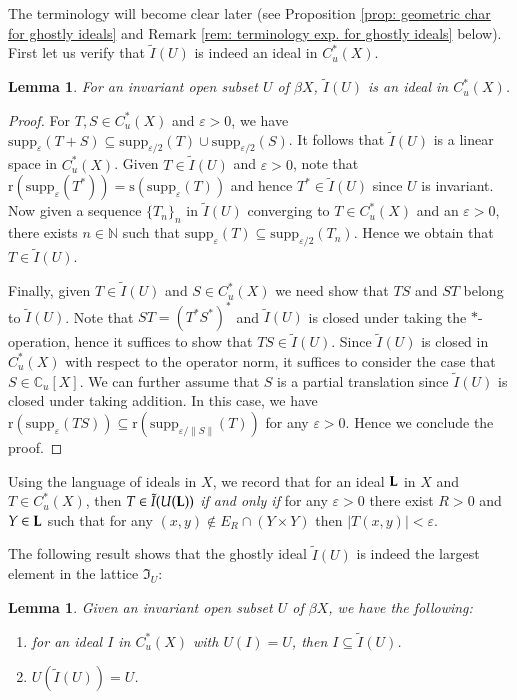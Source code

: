 \documentclass[12pt, a4paper]{amsart}
\numberwithin{equation}{section}
\newtheorem{lem}[thm]{Lemma}
\theoremstyle{definition}
\theoremstyle{remark}
\def\NN{\mathbb{N}}
\def\CC{\mathbb{C}}
\def\L{\mathcal{L}}
\def\supp{\mathrm{supp}}
\def\r{\mathrm{r}}
\def\s{\mathrm{s}}
\def\L{{\bf L}}
\begin{document}
The terminology will become clear later (see Proposition \ref{prop: geometric char for ghostly ideals} and Remark \ref{rem: terminology exp. for ghostly ideals} below). First let us verify that $\tilde{I}(U)$ is indeed an ideal in $C^*_u(X)$.

\begin{lem}\label{lem: ghostly ideals are ideals}
For an invariant open subset $U$ of $\beta X$, $\tilde{I}(U)$ is an ideal in $C^*_u(X)$.
\end{lem}

\begin{proof}
For $T,S \in C^*_u(X)$ and $\varepsilon>0$, we have $\supp_\varepsilon(T+S) \subseteq \supp_{\varepsilon/2}(T) \cup \supp_{\varepsilon/2}(S)$.
It follows that $\tilde{I}(U)$ is a linear space in $C^*_u(X)$. Given $T \in \tilde{I}(U)$ and $\varepsilon>0$, note that $\r(\supp_\varepsilon(T^*)) = \s(\supp_\varepsilon(T))$ and hence $T^* \in \tilde{I}(U)$ since $U$ is invariant. Now given a sequence $\{T_n\}_n$ in $\tilde{I}(U)$ converging to $T \in C^*_u(X)$ and an $\varepsilon>0$, there exists $n\in \NN$ such that $\supp_\varepsilon(T) \subseteq \supp_{\varepsilon/2}(T_n)$. Hence we obtain that $T \in \tilde{I}(U)$.

Finally, given $T \in \tilde{I}(U)$ and $S \in C^*_u(X)$ we need show that $TS$ and $ST$ belong to $\tilde{I}(U)$. Note that $ST=(T^*S^*)^*$ and $\tilde{I}(U)$ is closed under taking the $\ast$-operation, hence it suffices to show that $TS \in \tilde{I}(U)$. 
Since $\tilde{I}(U)$ is closed in $C^*_u(X)$ with respect to the operator norm, it suffices to consider the case that $S \in \CC_u[X]$.
We can further assume that $S$ is a partial translation since $\tilde{I}(U)$ is closed under taking addition. In this case, we have $\r(\supp_\varepsilon(TS)) \subseteq \r(\supp_{\varepsilon/\|S\|}(T))$ for any $\varepsilon>0$. Hence we conclude the proof.
\end{proof}

Using the language of ideals in $X$, we record that for an ideal $\L$ in $X$ and $T \in C^*_u(X)$, then $T \in \tilde{I}(U(\L))$ \emph{if and only if} for any $\varepsilon>0$ there exist $R>0$ and $Y \in \L$ such that for any $(x,y) \notin E_R \cap (Y \times Y)$ then $|T(x,y)| < \varepsilon$.

The following result shows that the ghostly ideal $\tilde{I}(U)$ is indeed the largest element in the lattice $\mathfrak{I}_U$:

\begin{lem}\label{lem: ghostly ideas are largest}
Given an invariant open subset $U$ of $\beta X$, we have the following:
\begin{enumerate}
 \item for an ideal $I$ in $C^*_u(X)$ with $U(I)=U$, then $I \subseteq \tilde{I}(U)$.
 \item $U(\tilde{I}(U))=U$.
\end{enumerate}
\end{lem}
\end{document}

